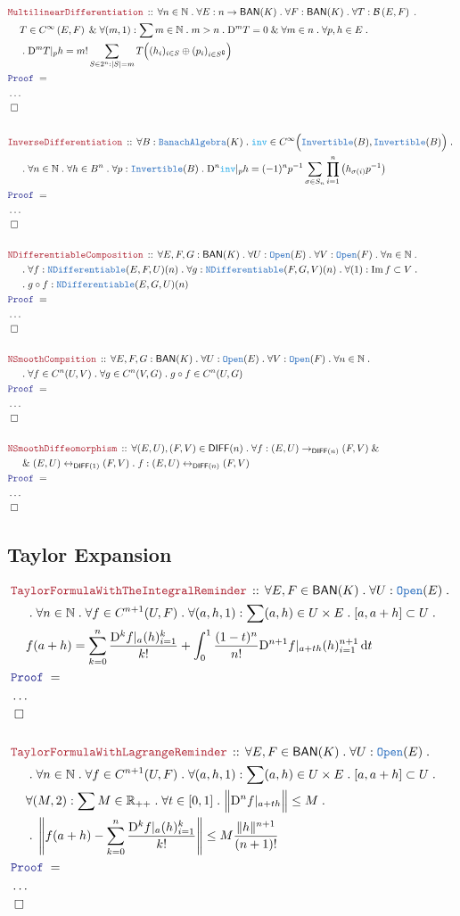 \documentclass[12pt]{scrartcl}
\newcommand{\TYPE}[1]{\textcolor{NavyBlue}{\mathtt{#1}}}
\newcommand{\FUNC}[1]{\textcolor{Cerulean}{\mathtt{#1}}}
\newcommand{\LOGIC}[1]{\textcolor{Blue}{\mathtt{#1}}}
\newcommand{\THM}[1]{\textcolor{Maroon}{\mathtt{#1}}}
\renewcommand{\.}{\; . \;}
\newcommand{\Theorem}[2]{& \THM{#1} \, :: \, #2 \\ & \Proof = \\ }
\newcommand{\NewLine}{\\ & \kern 1pc}
\newcommand{\Page}[1]{\begin{align*} #1 \end{align*}   }
\newcommand{\NoProof}{ & \ldots \\ \EndProof}
\renewcommand{\And}{\; \& \;}
\newcommand{\Reals}{\mathbb{R} }
\newcommand{\Nat}{\mathbb{N} }
\DeclareMathOperator*{\im}{Im}
\newcommand{\ToBij}{\leftrightarrow}
\renewcommand{\c}{\complement}
\newcommand{\QED}{\; \square}
\newcommand{\EndProof}{& \QED \\}
\newcommand{\Proof}{\LOGIC{Proof} \; }
\newcommand{\DIFF}{\mathsf{DIFF}}
\newcommand{\BAN}{\mathsf{BAN}} %
\newcommand{\D}{\mathrm{D}}
\newcommand{\B}{\mathcal{B}}
\begin{document}
\Page{
	\Theorem{MultilinearDifferentiation}{
		\forall n \in \Nat \. 
		\forall E : n \to \BAN(K) \.
		\forall F : \BAN(K) \.
		\forall T : \B\left( E , F  \right) \.
		\NewLine
		T \in C^\infty\left(E, F \right) 
		\And \forall (m,1) : \sum m \in \Nat \. m > n \.
		\D^m T = 0 \And \forall m \in n \. \forall p,h \in E \.
		\NewLine
		\.
		\D^m T |_p h = 
		m! \sum_{ S \in 2^n : |S| = m }  T\Big( (h_i)_{i \in S} \oplus (p_i )_{i \in S^\c}    \Big) 
	}       
	\NoProof
		\\
	\Theorem{InverseDifferentiation}{
			\forall B : \TYPE{BanachAlgebra}(K) \.
			\FUNC{inv} \in C^\infty\Big( \TYPE{Invertible}(B), \TYPE{Invertible}(B) \Big) \.
			\NewLine \.
			\forall n \in \Nat \. \forall h \in B^n \. \forall p : \TYPE{Invertible}(B) \.
			\D^n \FUNC{inv} |_p h  = (-1)^n p^{-1}\sum_{\sigma \in S_n} \prod^n_{i = 1} \big(h_{\sigma(i)} p^{-1} \big) 
		}
	\NoProof
	\\
	\Theorem{NDifferentiableComposition}{ 
		\forall E,F,G : \BAN(K) \. \forall U : \TYPE{Open}(E) \. \forall V : \TYPE{Open}(F) \. 
		\forall  n \in \Nat \.
		\NewLine \.
		\forall f : \TYPE{NDifferentiable}(E,F,U)(n) \. \forall g : \TYPE{NDifferentiable}(F,G,V)(n) \. 
		\forall (1) : \im f \subset V \.
		\NewLine \.
		g \circ f : \TYPE{NDifferentiable}(E,G,U)(n) 
	}
	\NoProof
	\\
	\Theorem{NSmoothCompsition}{
		\forall E,F,G : \BAN(K) \. \forall U : \TYPE{Open}(E) \. \forall V : \TYPE{Open}(F) \. 
		\forall  n \in \Nat \.
		\NewLine \.
		\forall f \in   C^n(U,V)\. \forall g \in C^n(V,G) \. 
		g \circ f \in C^n(U,G)
	}
	\NoProof
	\\
	\Theorem{NSmoothDiffeomorphism}{
		\forall (E,U), (F,V) \in \DIFF(n) \. \forall f : (E,U) \to_{\DIFF(n)} (F,V) \And 
		\NewLine \And
		(E,U) \ToBij_{\DIFF(1)} (F,V) \.
		f : (E,U) \ToBij_{\DIFF(n)} (F,V)
	}
	\NoProof
}
\newpage
\subsection{Taylor Expansion}
\Page{
	\Theorem{TaylorFormulaWithTheIntegralReminder}{ \forall E,F \in \BAN(K) \. \forall U : \TYPE{Open}(E) \. \NewLine   \. 
		\forall n \in \Nat \. \forall f \in C^{n + 1}(U,F) \. \forall (a,h,1) : \sum (a,h) \in U \times E \. [a,a + h] \subset U \.
		\NewLine
		f(a + h) = \sum^n_{k = 0} \frac{ \D^k f |_a (h)^k_{i = 1}  }{k!}  + \int^1_0 \frac{(1 - t)^n}{n!} \D^{n + 1} f |_{a + th} (h)^{n + 1}_{i = 1}   \,  \mathrm{d}t
	}
	\NoProof
        \\
	\Theorem{TaylorFormulaWithLagrangeReminder}{ \forall E,F \in \BAN(K) \. \forall U : \TYPE{Open}(E) \. \NewLine   \. 
		\forall n \in \Nat \. \forall f \in C^{n + 1}(U,F) \. \forall (a,h,1) : \sum (a,h) \in U \times E \. [a,a + h] \subset U \.
		\NewLine
		\forall (M,2) : \sum M \in \Reals_{++} \. \forall t \in [0,1] \.  \Big\| \D^n f |_{a + th}   \Big\| \le M  \. \NewLine \.
		\left\| f(a + h) - \sum^n_{k = 0} \frac{\D^k f |_a (h)^k_{i = 1}}{k!}   \right\| \le M \frac{ \| h \|^{n + 1} }{(n + 1)!}
	}
	\NoProof
	\\
}
\newpage
\end{document}
